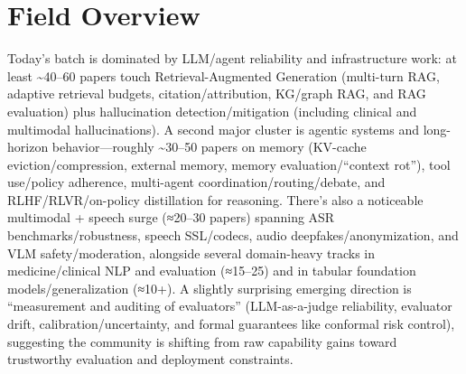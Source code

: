 \documentclass[12pt,letterpaper]{article}
\begin{document}
\medskip



\section*{Field Overview}
{\footnotesize Today's batch is dominated by LLM/agent reliability and infrastructure work: at least \textasciitilde{}40--60 papers touch Retrieval-Augmented Generation (multi-turn RAG, adaptive retrieval budgets, citation/attribution, KG/graph RAG, and RAG evaluation) plus hallucination detection/mitigation (including clinical and multimodal hallucinations). A second major cluster is agentic systems and long-horizon behavior---roughly \textasciitilde{}30--50 papers on memory (KV-cache eviction/compression, external memory, memory evaluation/``context rot''), tool use/policy adherence, multi-agent coordination/routing/debate, and RLHF/RLVR/on-policy distillation for reasoning. There's also a noticeable multimodal + speech surge (≈20--30 papers) spanning ASR benchmarks/robustness, speech SSL/codecs, audio deepfakes/anonymization, and VLM safety/moderation, alongside several domain-heavy tracks in medicine/clinical NLP and evaluation (≈15--25) and in tabular foundation models/generalization (≈10+). A slightly surprising emerging direction is ``measurement and auditing of evaluators'' (LLM-as-a-judge reliability, evaluator drift, calibration/uncertainty, and formal guarantees like conformal risk control), suggesting the community is shifting from raw capability gains toward trustworthy evaluation and deployment constraints.}
\end{document}

